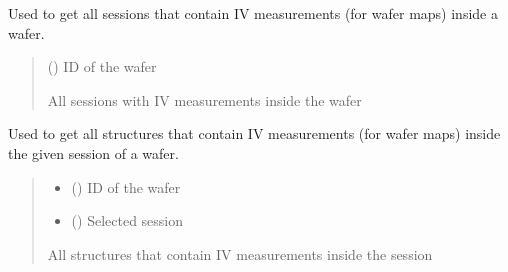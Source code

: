 \documentclass[letterpaper,10pt,english]{sphinxmanual}
\begin{document}

\begin{fulllineitems}
\label{\detokenize{getter:getter.get_map_sessions}}
\pysigstartsignatures
{}
\pysigstopsignatures
\sphinxAtStartPar
Used to get all sessions that contain I\sphinxhyphen{}V measurements (for wafer maps) inside a wafer.
\begin{quote}\begin{description}
\sphinxAtStartPar
{} () \textendash{} ID of the wafer

\sphinxAtStartPar
All sessions with I\sphinxhyphen{}V measurements inside the wafer

\end{description}\end{quote}

\end{fulllineitems}


\begin{fulllineitems}
\label{\detokenize{getter:getter.get_map_structures}}
\pysigstartsignatures
{}
\pysigstopsignatures
\sphinxAtStartPar
Used to get all structures that contain I\sphinxhyphen{}V measurements (for wafer maps) inside the given session of a wafer.
\begin{quote}\begin{description}
\begin{itemize}
\item {} 
\sphinxAtStartPar
{} () \textendash{} ID of the wafer

\item {} 
\sphinxAtStartPar
{} () \textendash{} Selected session

\end{itemize}

\sphinxAtStartPar
All structures that contain I\sphinxhyphen{}V measurements inside the session

\end{description}\end{quote}

\end{fulllineitems}
\end{document}
